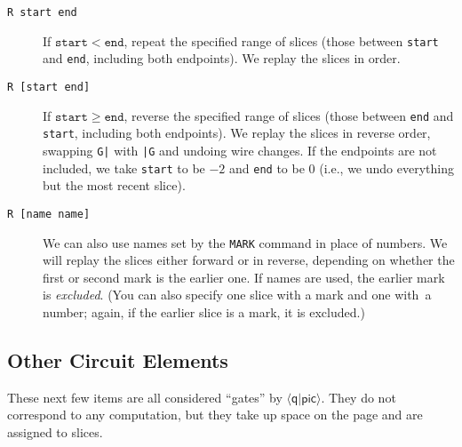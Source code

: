 \documentclass[twoside,12pt]{article}
\newcommand{\qpic}{$\langle\mathsf{q}|\mathsf{pic}\rangle$\xspace}
\begin{document}
\begin{description}
\item[{\tt R start end}] If $\mathtt{start} < \mathtt{end}$, repeat the specified range of
slices (those between {\tt start} and {\tt end}, including both endpoints).  We replay the slices in order.

\begin{minipage}[b]{2in}

\end{minipage} \hfill 

\item[{\tt R [start end]}] If $\mathtt{start} \ge \mathtt{end}$, reverse the specified range of slices
(those between {\tt end} and {\tt start}, including both endpoints).  We replay the slices
in reverse order, swapping {\tt G|} with {\tt |G} and undoing wire changes.  If the endpoints are not included,
we take {\tt start} to be $-2$ and {\tt end} to be $0$ (i.e., we undo everything but the most recent slice).

\begin{minipage}[b]{2in}

\end{minipage} \hfill 

\item[{\tt R [name name]}] We can also use names set by the {\tt MARK} command in place
  of numbers.  We will replay the slices either forward or in reverse, depending on
  whether the first or second mark is the earlier one.  If names are used, the earlier
  mark is \emph{excluded}.  (You can also specify one slice with a mark and one with\
  a number; again, if the earlier slice is a mark, it is excluded.)

\begin{minipage}[b]{2in}

\end{minipage} \hfill 

\end{description}

\subsection{Other Circuit Elements}

These next few items are all considered ``gates'' by \qpic.  They do not
correspond to any computation, but they take up space on the page and are assigned to
slices.
\end{document}
